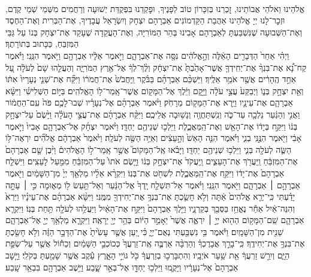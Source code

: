 \documentclass[twoside, openany, parskip=half, 11pt]{book}
\begin{document}
\\
אֱלֹהֵינוּ וֵאלֹהֵי אֲבוֹתֵינוּ, זׇכְרֵנוּ בְּזִכָּרוֹן טוֹב לְפָנֶיךָ, וּפׇקְדֵנוּ בִּפְקֻדַּת יְשׁוּעָה וְרַחֲמִים מִשְּׁמֵי שְׁמֵי קֶדֶם, וּזְכׇר־לָנוּ יְיָ אֱלֹהֵינוּ אַהֲבַת הַקַּדְמוֹנִים אַבְרָהָם יִצְחָק וְיִשְׂרָאֵל עֲבָדֶיךָ, אֶת־הַבְּרִית וְאֶת־הַחֶסֶד וְאֶת־הַשְּׁבוּעָה שֶׁנִּשְׁבַּעְתָּ לְאַבְרָהָם אָבִינוּ בְּהַר הַמּוֹרִיָּה, וְאֶת־הָעֲקֵדָה שֶׁעָקַד אֶת־יִצְחָק בְּנוֹ עַל גַּבֵּי הַמִּזְבֵּחַ, כַּכָּתוּב בְּתוֹרָתֶךָ׃\\
וַיְהִ֗י אַחַר֙ הַדְּבָרִ֣ים הָאֵ֔לֶּה  וְהָ֣אֱלֹהִ֔ים נִסָּ֖ה אֶת־אַבְרָהָ֑ם וַיֹּ֣אמֶר אֵלָ֔יו אַבְרָהָ֖ם וַיֹּ֥אמֶר הִנֵּֽנִי׃ וַיֹּ֡אמֶר קַח־נָ֠א אֶת־בִּנְךָ֨ אֶת־יְחִֽידְךָ֤ אֲשֶׁר־אָהַ֙בְתָּ֙ אֶת־יִצְחָ֔ק וְלֶ֨ךְ־לְךָ֔ אֶל־אֶ֖רֶץ הַמֹּרִיָּ֑ה וְהַעֲלֵ֤הוּ שָׁם֙ לְעֹלָ֔ה עַ֚ל אַחַ֣ד הֶֽהָרִ֔ים אֲשֶׁ֖ר אֹמַ֥ר אֵלֶֽיךָ׃ וַיַּשְׁכֵּ֨ם אַבְרָהָ֜ם בַּבֹּ֗קֶר וַֽיַּחֲבֹשׁ֙ אֶת־חֲמֹר֔וֹ וַיִּקַּ֞ח אֶת־שְׁנֵ֤י נְעָרָיו֙ אִתּ֔וֹ וְאֵ֖ת יִצְחָ֣ק בְּנ֑וֹ וַיְבַקַּע֙ עֲצֵ֣י עֹלָ֔ה וַיָּ֣קׇם וַיֵּ֔לֶךְ אֶל־הַמָּק֖וֹם אֲשֶׁר־אָֽמַר־ל֥וֹ הָאֱלֹהִֽים׃ בַּיּ֣וֹם הַשְּׁלִישִׁ֗י וַיִּשָּׂ֨א אַבְרָהָ֧ם אֶת־עֵינָ֛יו וַיַּ֥רְא אֶת־הַמָּק֖וֹם מֵרָחֹֽק׃ וַיֹּ֨אמֶר אַבְרָהָ֜ם אֶל־נְעָרָ֗יו שְׁבוּ־לָכֶ֥ם פֹּה֙ עִֽם־הַחֲמ֔וֹר וַאֲנִ֣י וְהַנַּ֔עַר נֵלְכָ֖ה עַד־כֹּ֑ה וְנִֽשְׁתַּחֲוֶ֖ה וְנָשׁ֥וּבָה אֲלֵיכֶֽם׃ וַיִּקַּ֨ח אַבְרָהָ֜ם אֶת־עֲצֵ֣י הָעֹלָ֗ה וַיָּ֙שֶׂם֙ עַל־יִצְחָ֣ק בְּנ֔וֹ וַיִּקַּ֣ח בְּיָד֔וֹ אֶת־הָאֵ֖שׁ וְאֶת־הַֽמַּאֲכֶ֑לֶת וַיֵּלְכ֥וּ שְׁנֵיהֶ֖ם יַחְדָּֽו׃ וַיֹּ֨אמֶר יִצְחָ֜ק אֶל־אַבְרָהָ֤ם אָבִיו֙ וַיֹּ֣אמֶר אָבִ֔י וַיֹּ֖אמֶר הִנֶּ֣נִּֽי בְנִ֑י וַיֹּ֗אמֶר הִנֵּ֤ה הָאֵשׁ֙ וְהָ֣עֵצִ֔ים וְאַיֵּ֥ה הַשֶּׂ֖ה לְעֹלָֽה׃ וַיֹּ֙אמֶר֙ אַבְרָהָ֔ם אֱלֹהִ֞ים יִרְאֶה־לּ֥וֹ הַשֶּׂ֛ה לְעֹלָ֖ה בְּנִ֑י וַיֵּלְכ֥וּ שְׁנֵיהֶ֖ם יַחְדָּֽו׃ וַיָּבֹ֗אוּ אֶֽל־הַמָּקוֹם֮ אֲשֶׁ֣ר אָֽמַר־ל֣וֹ הָאֱלֹהִים֒ וַיִּ֨בֶן שָׁ֤ם אַבְרָהָם֙ אֶת־הַמִּזְבֵּ֔חַ וַֽיַּעֲרֹ֖ךְ אֶת־הָעֵצִ֑ים וַֽיַּעֲקֹד֙ אֶת־יִצְחָ֣ק בְּנ֔וֹ וַיָּ֤שֶׂם אֹתוֹ֙ עַל־הַמִּזְבֵּ֔חַ מִמַּ֖עַל לָעֵצִֽים׃ וַיִּשְׁלַ֤ח אַבְרָהָם֙ אֶת־יָד֔וֹ וַיִּקַּ֖ח אֶת־הַֽמַּאֲכֶ֑לֶת לִשְׁחֹ֖ט אֶת־בְּנֽוֹ׃ וַיִּקְרָ֨א אֵלָ֜יו מַלְאַ֤ךְ יְיָ֙ מִן־הַשָּׁמַ֔יִם וַיֹּ֖אמֶר אַבְרָהָ֣ם ׀ אַבְרָהָ֑ם וַיֹּ֖אמֶר הִנֵּֽנִי׃ וַיֹּ֗אמֶר אַל־תִּשְׁלַ֤ח יָֽדְךָ֙ אֶל־הַנַּ֔עַר וְאַל־תַּ֥עַשׂ ל֖וֹ מְא֑וּמָה כִּ֣י ׀ עַתָּ֣ה יָדַ֗עְתִּי כִּֽי־יְרֵ֤א אֱלֹהִים֙ אַ֔תָּה וְלֹ֥א חָשַׂ֛כְתָּ אֶת־בִּנְךָ֥ אֶת־יְחִידְךָ֖ מִמֶּֽנִּי׃ וַיִּשָּׂ֨א אַבְרָהָ֜ם אֶת־עֵינָ֗יו וַיַּרְא֙ וְהִנֵּה־אַ֔יִל אַחַ֕ר נֶאֱחַ֥ז בַּסְּבַ֖ךְ בְּקַרְנָ֑יו וַיֵּ֤לֶךְ אַבְרָהָם֙ וַיִּקַּ֣ח אֶת־הָאַ֔יִל וַיַּעֲלֵ֥הוּ לְעֹלָ֖ה תַּ֥חַת בְּנֽוֹ׃ וַיִּקְרָ֧א אַבְרָהָ֛ם שֵֽׁם־הַמָּק֥וֹם הַה֖וּא יְיָ֣ ׀ יִרְאֶ֑ה אֲשֶׁר֙ יֵאָמֵ֣ר הַיּ֔וֹם בְּהַ֥ר יְיָ֖ יֵרָאֶֽה׃ וַיִּקְרָ֛א מַלְאַ֥ךְ יְיָ֖ אֶל־אַבְרָהָ֑ם שֵׁנִ֖ית מִן־הַשָּׁמָֽיִם׃ וַיֹּ֕אמֶר בִּ֥י נִשְׁבַּ֖עְתִּי נְאֻם־יְיָ֑ כִּ֗י יַ֚עַן אֲשֶׁ֤ר עָשִׂ֙יתָ֙ אֶת־הַדָּבָ֣ר הַזֶּ֔ה וְלֹ֥א חָשַׂ֖כְתָּ אֶת־בִּנְךָ֥ אֶת־יְחִידֶֽךָ׃ כִּֽי־בָרֵ֣ךְ אֲבָרֶכְךָ֗ וְהַרְבָּ֨ה אַרְבֶּ֤ה אֶֽת־זַרְעֲךָ֙ כְּכוֹכְבֵ֣י הַשָּׁמַ֔יִם וְכַח֕וֹל אֲשֶׁ֖ר עַל־שְׂפַ֣ת הַיָּ֑ם וְיִרַ֣שׁ זַרְעֲךָ֔ אֵ֖ת שַׁ֥עַר אֹיְבָֽיו׃ וְהִתְבָּרְכ֣וּ בְזַרְעֲךָ֔ כֹּ֖ל גּוֹיֵ֣י הָאָ֑רֶץ עֵ֕קֶב אֲשֶׁ֥ר שָׁמַ֖עְתָּ בְּקֹלִֽי׃ וַיָּ֤שׇׁב אַבְרָהָם֙ אֶל־נְעָרָ֔יו וַיָּקֻ֛מוּ וַיֵּלְכ֥וּ יַחְדָּ֖ו אֶל־בְּאֵ֣ר שָׁ֑בַע וַיֵּ֥שֶׁב אַבְרָהָ֖ם בִּבְאֵ֥ר שָֽׁבַע׃
\end{document}

